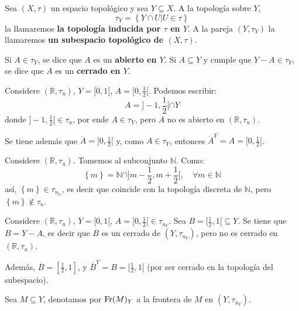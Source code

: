 \documentclass[12pt]{report}
\theoremstyle{largebreak}
\newcommand{\Int}[1]{\ensuremath{\mathring{#1}}}
\newcommand{\Cls}[1]{\ensuremath{\overline{#1}}}
\newcommand{\Fr}[1]{\ensuremath{\textup{Fr}(#1)}}
\begin{document}
    \begin{mydef}
        Sea $(X,\tau)$ un espacio topológico y sea $Y\subseteq X$. A la topología sobre $Y$,
        \begin{equation*}
            \tau_Y=\left\{Y\cap U\Big|U\in\tau \right\}
        \end{equation*}
        la llamaremos \textbf{la topología inducida por $\tau$ en $Y$}. A la pareja $(Y,\tau_Y)$ la llamaremos \textbf{un subespacio topológico de $(X,\tau)$}.

        Si $A\in\tau_Y$, se dice que $A$ es un \textbf{abierto en $Y$}. Si $A\subseteq Y$ y cumple que $Y-A\in\tau_Y$, se dice que $A$ es un \textbf{cerrado en $Y$}.
    \end{mydef}

    \begin{exa}
        Considere $(\mathbb{R},\tau_u)$, $Y=[0,1[$, $A=[0,\frac{1}{2}[$. Podemos escribir:
        \begin{equation*}
            A=]-1,\frac{1}{2}[\cap Y
        \end{equation*}
        donde $]-1,\frac{1}{2}[\in\tau_u$, por ende $A\in\tau_Y$, pero $A$ no es abierto en $(\mathbb{R},\tau_u)$.

        Se tiene además que $\Int{A}=]0,\frac{1}{2}[$ y, como $A\in\tau_Y$, entonces $\Int{A}^Y=A=[0,\frac{1}{2}[$.
    \end{exa}

    \begin{exa}
        Considere $(\mathbb{R},\tau_u)$. Tomemos al subconjunto $\mathbb{N}$. Como:
        \begin{equation*}
            \left\{m\right\}=\mathbb{N}\cap]m-\frac{1}{2},m+\frac{1}{2}[,\quad\forall m\in\mathbb{N}
        \end{equation*}
        así, $\left\{m \right\}\in\tau_{u_\mathbb{N}}$, es decir que coincide con la topología discreta de $\mathbb{N}$, pero $\left\{m\right\}\notin\tau_u$.
    \end{exa}

    \begin{exa}
        Considere $(\mathbb{R},\tau_u)$, $Y=[0,1[$, $A=[0,\frac{1}{2}[\in\tau_{u_Y }$. Sea $B=[\frac{1}{2},1[\subseteq Y$. Se tiene que $B=Y-A$, es decir que $B$ es un cerrado de $(Y,\tau_{u_Y })$, pero no es cerrado en $(\mathbb{R},\tau_u)$.

        Además, $\Cls{B}=[\frac{1}{2},1]$, y $\Cls{B}^Y=B=[\frac{1}{2},1[$ (por ser cerrado en la topología del subespacio).

        Sea $M\subseteq Y$, denotamos por $\Fr{M}_Y$ a la frontera de $M$ en $(Y,\tau_{u_Y })$.
    \end{exa}
\end{document}
